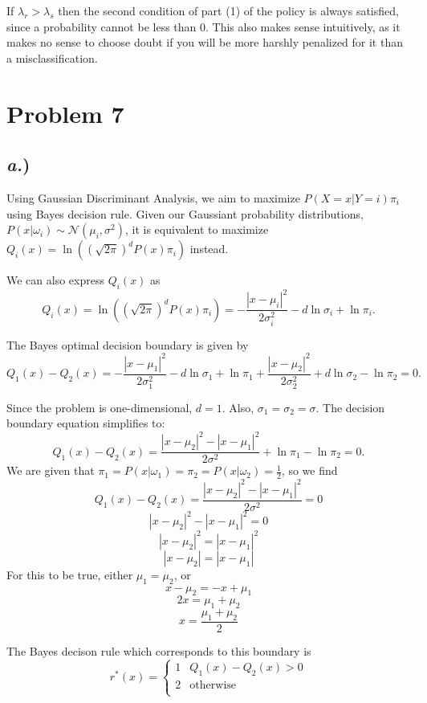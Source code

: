 \documentclass{report}
\begin{document}
If $\lambda_r > \lambda_s$ then the second condition of part (1) of the policy is always satisfied, since a probability cannot be less than 0. This also makes sense intuitively, as it makes no sense to choose doubt if you will be more harshly penalized for it than a misclassification.



\newpage
\section*{Problem 7}

\subsection*{\textit{a.})}

Using Gaussian Discriminant Analysis, we aim to maximize $P(X=x|Y=i)\pi_i$ using Bayes decision rule. Given our Gaussiant probability distributions, $P(x|\omega_i) \sim \mathcal{N}(\mu_i,\sigma^2)$, it is equivalent to maximize $Q_i(x) = \ln\left(\left(\sqrt{2\pi}\right)^d P(x)\pi_i\right)$ instead.

We can also express $Q_i(x)$ as 
$$ Q_i(x) = \ln\left(\left(\sqrt{2\pi}\right)^d P(x)\pi_i\right) = -\frac{|x-\mu_i|^2}{2\sigma_i^2} - d\ln\sigma_i + \ln\pi_i. $$

The Bayes optimal decision boundary is given by 
$$ Q_1(x) - Q_2(x) = -\frac{|x-\mu_1|^2}{2\sigma_1^2} - d\ln\sigma_1 + \ln\pi_1 + \frac{|x-\mu_2|^2}{2\sigma_2^2} + d\ln\sigma_2 - \ln\pi_2 = 0 .$$

Since the problem is one-dimensional, $d=1$. Also, $\sigma_1 = \sigma_2 = \sigma$. The decision boundary equation simplifies to:
$$ Q_1(x) - Q_2(x) = \frac{|x-\mu_2|^2-|x-\mu_1|^2}{2\sigma^2} + \ln\pi_1 - \ln\pi_2 = 0.$$
We are given that $\pi_1 = P(x|\omega_1) = \pi_2 = P(x|\omega_2) = \frac{1}{2}$, so we find
$$ Q_1(x) - Q_2(x) = \frac{|x-\mu_2|^2-|x-\mu_1|^2}{2\sigma^2} = 0 $$
$$|x-\mu_2|^2-|x-\mu_1|^2 = 0 $$
$$|x-\mu_2|^2 = |x-\mu_1|^2 $$
$$|x-\mu_2| = |x-\mu_1| $$
For this to be true, either $\mu_1 = \mu_2$, or
$$ x - \mu_2 = -x + \mu_1 $$
$$ 2x = \mu_1 + \mu_2 $$
$$ x = \frac{\mu_1 + \mu_2}{2} $$

The Bayes decison rule which corresponds to this boundary is
$$ r^*(x) = 
\begin{cases} 
	1 & Q_1(x) - Q_2(x) > 0 \\
	2 & \text{otherwise} \\
\end{cases}
$$
\end{document}
